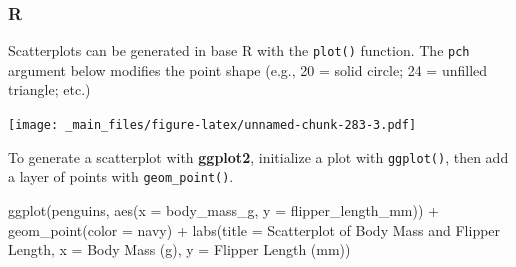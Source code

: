 \documentclass[
]{book}
\newenvironment{Shaded}{\begin{snugshade}}{\end{snugshade}}
\newcommand{\AttributeTok}[1]{\textcolor[rgb]{0.77,0.63,0.00}{#1}}
\newcommand{\DecValTok}[1]{\textcolor[rgb]{0.00,0.00,0.81}{#1}}
\newcommand{\FunctionTok}[1]{\textcolor[rgb]{0.00,0.00,0.00}{#1}}
\newcommand{\NormalTok}[1]{#1}
\newcommand{\SpecialCharTok}[1]{\textcolor[rgb]{0.00,0.00,0.00}{#1}}
\newcommand{\StringTok}[1]{\textcolor[rgb]{0.31,0.60,0.02}{#1}}
\begin{document}
\hypertarget{r-43}{%
\subsubsection*{R}\label{r-43}}

Scatterplots can be generated in base R with the \texttt{plot()} function. The \texttt{pch} argument below modifies the point shape (e.g., 20 = solid circle; 24 = unfilled triangle; etc.)

\begin{Shaded}
\end{Shaded}

\texttt{[image: \_main\_files/figure-latex/unnamed-chunk-283-3.pdf]}

To generate a scatterplot with \textbf{ggplot2}, initialize a plot with \texttt{ggplot()}, then add a layer of points with \texttt{geom\_point()}.

\begin{Shaded}
\begin{Highlighting}[]
\FunctionTok{ggplot}\NormalTok{(penguins, }\FunctionTok{aes}\NormalTok{(}\AttributeTok{x =}\NormalTok{ body\_mass\_g, }\AttributeTok{y =}\NormalTok{ flipper\_length\_mm)) }\SpecialCharTok{+}
  \FunctionTok{geom\_point}\NormalTok{(}\AttributeTok{color =} \StringTok{\textquotesingle{}navy\textquotesingle{}}\NormalTok{) }\SpecialCharTok{+}
  \FunctionTok{labs}\NormalTok{(}\AttributeTok{title =} \StringTok{\textquotesingle{}Scatterplot of Body Mass and Flipper Length\textquotesingle{}}\NormalTok{, }
       \AttributeTok{x =} \StringTok{\textquotesingle{}Body Mass (g)\textquotesingle{}}\NormalTok{, }\AttributeTok{y =} \StringTok{\textquotesingle{}Flipper Length (mm)\textquotesingle{}}\NormalTok{)}
\end{Highlighting}
\end{Shaded}
\end{document}
